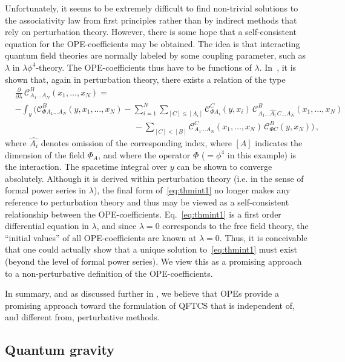\documentclass[12pt]{article}
\newcommand{\cC}{\mathcal{C}}
\renewcommand{\O}{\Phi}
\theoremstyle{plain}
\theoremstyle{definition}
\def\ben{\begin{equation}}
\def\een{\end{equation}}
\begin{document}
Unfortunately, it seems to be extremely difficult to find non-trivial solutions to the associativity law from first principles rather than by indirect methods that rely on perturbation theory.  However, there is some hope that a self-consistent equation for the OPE-coefficients may be obtained. The idea is that interacting quantum field theories are normally
labeled by some coupling parameter, such as $\lambda$ in $\lambda \phi^4$-theory. The OPE-coefficients thus have to be functions of $\lambda$. In~\cite{h6}, it is shown that, again
in perturbation theory, there exists a relation of the type
\ben\label{eq:thmint1}
\begin{split}
& \frac{\partial}{\partial \lambda} \, \cC_{A_{1}\dots A_{N}}^{B}(x_{1},\dots, x_{N})=  \\
& - \int_y  \bigg( \cC_{\O A_{1}\dots A_{N} }^{B}(y,x_{1},\ldots,x_{N})-\sum_{i=1}^{N}\sum_{[C]\le [A_{i}]} \!\!\!\cC_{\O A_{i}}^{C}(y,x_{i})\, \cC_{A_{1}\dots \widehat{A_{i}}\,C\dots A_{N}}^{B}(x_{1},\dots, x_{N}) \\
&\qquad\qquad\qquad \qquad\qquad\qquad\qquad -\sum_{[C]< [B]} \cC_{A_{1}\dots A_{N}}^{C}(x_{1},\ldots,x_{N})\, \cC_{\O C }^{B}(y,x_{N}) \bigg) \, ,
\end{split}
\een
where $\widehat{A_{i}}$ denotes omission of the corresponding index, where $[A]$ indicates the dimension of the field $\O_A$,
and where the operator $\O$ ($= \phi^4$ in this example) is the interaction. The spacetime integral over $y$ can be shown to converge absolutely. Although it is derived within perturbation theory (i.e. in the sense
of formal power series in $\lambda$), the final form of~\eqref{eq:thmint1} no longer makes any reference to perturbation
theory and thus may be viewed as a self-consistent relationship between the OPE-coefficients. Eq.~\eqref{eq:thmint1} is a first order differential equation in $\lambda$, and since $\lambda=0$
corresponds to the free field theory, the ``initial values'' of all OPE-coefficients are known at $\lambda=0$. Thus, it is conceivable that one could actually show that a unique solution to~\eqref{eq:thmint1} must exist (beyond the level of formal power series). We view this as a promising approach to a non-perturbative definition of the OPE-coefficients.

In summary, and as discussed further in \cite{hw5}, we believe that OPEs provide a promising approach toward the formulation
of QFTCS that is independent of, and different from, perturbative methods.


\subsection{Quantum gravity} \label{sec:qg}
\end{document}
